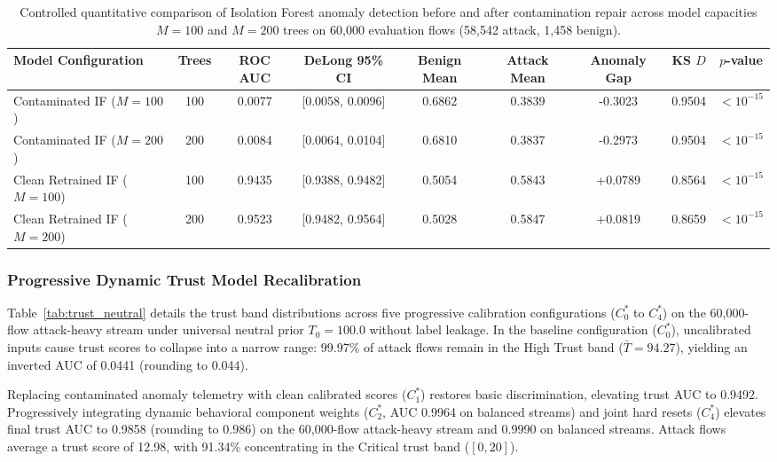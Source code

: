 \documentclass[journal,10pt,onecolumn]{IEEEtran}
\begin{document}
\begin{table}[t]
\caption{Controlled quantitative comparison of Isolation Forest anomaly detection before and after contamination repair across model capacities $M=100$ and $M=200$ trees on 60,000 evaluation flows (58,542 attack, 1,458 benign).}
\label{tab:if_controlled}
\centering
\small
\begin{tabular}{lcccccccc}
\toprule
\textbf{Model Configuration} & \textbf{Trees} & \textbf{ROC AUC} & \textbf{DeLong 95\% CI} & \textbf{Benign Mean} & \textbf{Attack Mean} & \textbf{Anomaly Gap} & \textbf{KS $D$} & \textbf{$p$-value} \\
\midrule
Contaminated IF ($M=100$) & 100 & 0.0077 & [0.0058, 0.0096] & 0.6862 & 0.3839 & -0.3023 & 0.9504 & $< 10^{-15}$ \\
Contaminated IF ($M=200$) & 200 & 0.0084 & [0.0064, 0.0104] & 0.6810 & 0.3837 & -0.2973 & 0.9504 & $< 10^{-15}$ \\
Clean Retrained IF ($M=100$) & 100 & 0.9435 & [0.9388, 0.9482] & 0.5054 & 0.5843 & +0.0789 & 0.8564 & $< 10^{-15}$ \\
Clean Retrained IF ($M=200$) & 200 & 0.9523 & [0.9482, 0.9564] & 0.5028 & 0.5847 & +0.0819 & 0.8659 & $< 10^{-15}$ \\
\bottomrule
\end{tabular}
\end{table}

\subsubsection{Progressive Dynamic Trust Model Recalibration}
Table~\ref{tab:trust_neutral} details the trust band distributions across five progressive calibration configurations ($C_0^*$ to $C_4^*$) on the 60,000-flow attack-heavy stream under universal neutral prior $T_0 = 100.0$ without label leakage. In the baseline configuration ($C_0^*$), uncalibrated inputs cause trust scores to collapse into a narrow range: 99.97\% of attack flows remain in the High Trust band ($\bar{T} = 94.27$), yielding an inverted AUC of 0.0441 (rounding to 0.044).

Replacing contaminated anomaly telemetry with clean calibrated scores ($C_1^*$) restores basic discrimination, elevating trust AUC to 0.9492. Progressively integrating dynamic behavioral component weights ($C_2^*$, AUC 0.9964 on balanced streams) and joint hard resets ($C_4^*$) elevates final trust AUC to 0.9858 (rounding to 0.986) on the 60,000-flow attack-heavy stream and 0.9990 on balanced streams. Attack flows average a trust score of 12.98, with 91.34\% concentrating in the Critical trust band ($[0, 20]$).
\end{document}
